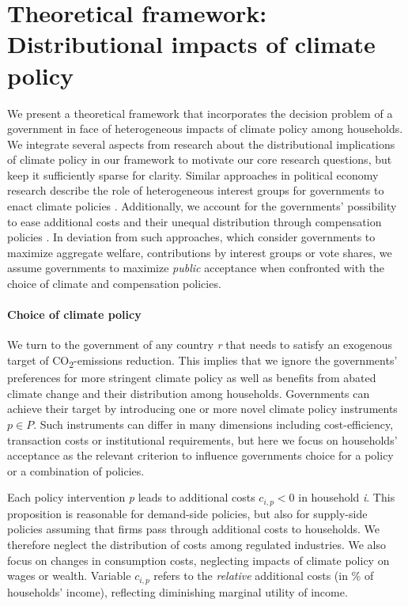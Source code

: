 \documentclass[12pt, a4paper]{article}
\begin{document}
\section{Theoretical framework: Distributional impacts of climate policy} \label{sec:literature}

We present a theoretical framework that incorporates the decision problem of a government in face of heterogeneous impacts of climate policy among households. We integrate several aspects from research about the distributional implications of climate policy in our framework to motivate our core research questions, but keep it sufficiently sparse for clarity. Similar approaches in political economy research describe the role of heterogeneous interest groups for governments to enact climate policies \autocite{Aidt.1998,Fredriksson.1997}. Additionally, we account for the governments' possibility to ease additional costs and their unequal distribution through compensation policies \autocite{Lindbeck.1987,Aidt.1998,Cremer.2004}. In deviation from such approaches, which consider governments to maximize aggregate welfare, contributions by interest groups or vote shares, we assume governments to maximize \textit{public} acceptance \autocite[e.g.,][]{Downs.1957,Stigler.1971} when confronted with the choice of climate and compensation policies. 

\paragraph{Choice of climate policy} 
We turn to the government of any country \textit{r} that needs to satisfy an exogenous target of CO\textsubscript{2}-emissions reduction. This implies that we ignore the governments' preferences for more stringent climate policy as well as benefits from abated climate change and their distribution among households. Governments can achieve their target by introducing one or more novel climate policy instruments $p \in P$. Such instruments can differ in many dimensions including cost-efficiency, transaction costs or institutional requirements, but here we focus on households' acceptance as the relevant criterion to influence  governments choice for a policy or a combination of policies.

Each policy intervention \textit{p} leads to additional costs $c_{i,p}<0$ in household \textit{i}. This proposition is reasonable for demand-side policies, but also for supply-side policies assuming that firms pass through additional costs to households. We therefore neglect the distribution of costs among regulated industries. We also focus on changes in consumption costs, neglecting impacts of climate policy on wages or wealth. Variable $c_{i,p}$ refers to the \textit{relative} additional costs (in \% of households' income), reflecting diminishing marginal utility of income.
\end{document}
